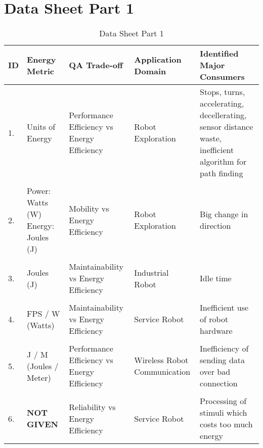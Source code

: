 \section{Data Sheet Part 1}
\label{appendix:data_sheet_1}

\begin{table}[h]
    \centering
    \caption{Data Sheet Part 1}
    \begin{tabular}{p{0.1cm}p{3cm}p{4cm}p{4cm}p{4cm}}
        \toprule
            {ID} &
                {Energy Metric}      & 
                {QA Trade-off}       & 
                {Application Domain} &
                {Identified Major Consumers}    \\
        \midrule
            {1.} &
                {Units of Energy} &
                {Performance Efficiency vs Energy Efficiency} &
                {Robot Exploration} &
                {Stops, turns, accelerating, decellerating, sensor distance waste, 
                inefficient algorithm for path finding} \\
            \hline
            \\
            {2.} &
                {Power: Watts (W)
                Energy: Joules (J)} &
                {Mobility vs Energy Efficiency} &
                {Robot Exploration} &
                {Big change in direction} \\
            \hline
            \\
            {3.} &
                {Joules (J)} &
                {Maintainability vs Energy Efficiency} &
                {Industrial Robot} &
                {Idle time} \\
            \hline
            \\
            {4.} &
                {FPS / W (Watts)} &
                {Maintainability vs Energy Efficiency} &
                {Service Robot} &
                {Inefficient use of robot hardware} \\
            \hline
            \\
            {5.} &
                {J / M (Joules / Meter)} &
                {Performance Efficiency vs Energy Efficiency} &
                {Wireless Robot Communication} &
                {Inefficiency of sending data over bad connection} \\
            \hline
            \\
            {6.} &
                {\textbf{NOT GIVEN}} &
                {Reliability vs Energy Efficiency} &
                {Service Robot} &
                {Processing of stimuli which costs too much energy} \\

\end{tabular}
\end{table}
